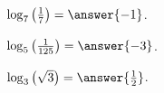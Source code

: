 \documentclass{ximera}
\author{Lee Wayand}
\begin{document}
\begin{exercise}







\begin{question}


$\log_7\left( \frac{1}{7} \right) = \answer{-1}$.


\end{question}








\begin{question}


$\log_5\left( \frac{1}{125} \right) = \answer{-3}$.


\end{question}











\begin{question}


$\log_3\left( \sqrt{3} \right) = \answer{\frac{1}{2}}$.


\end{question}









\end{exercise}
\end{document}
